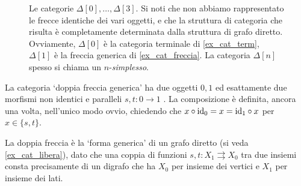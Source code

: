 \begin{example}
\begin{figure}[h]
\begin{center}
		\end{center}
		\caption{Le categorie \(\Delta[0], \dots,\Delta[3]\). Si noti che non abbiamo rappresentato le frecce identiche dei vari oggetti, e che la struttura di categoria che risulta è completamente determinata dalla struttura di grafo diretto. Ovviamente, \(\Delta[0]\) è la categoria terminale di \ref{ex_cat_term}, \(\Delta[1]\) è la freccia generica di \ref{ex_cat_freccia}. La categoria \(\Delta[n]\) spesso si chiama un \(n\)-\emph{simplesso}. }
		\label{fig:le_delta}
	\end{figure}
\end{example}
\begin{example}\label{ex_cat_doppiafreccia}
	La categoria `doppia freccia generica' ha due oggetti \(0,1\) ed esattamente due morfismi non identici e paralleli \(s,t : 0\to 1\)%
	. La composizione è definita, ancora una volta, nell'unico modo ovvio, chiedendo che \(x\circ \mathrm{id}_0=x=\mathrm{id}_1\circ x\) per \(x\in\{s,t\}\).

	La doppia freccia è la `forma generica' di un grafo diretto (si veda \ref{ex_cat_libera}), dato che una coppia di funzioni \(s,t: X_1 \rightrightarrows X_0\) tra due insiemi consta precisamente di un digrafo che ha \(X_0\) per insieme dei vertici e \(X_1\) per insieme dei lati.
\end{example}
